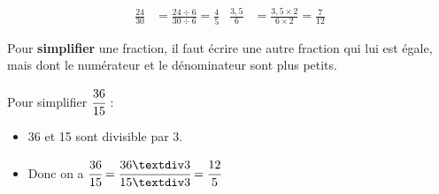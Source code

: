 \documentclass[a4paper,11pt]{article}
\begin{document}
\begin{exemple}
	\begin{align*}
		\frac{24}{30} & = \frac{24 ÷ 6}{30 ÷ 6} = \frac{4}{5}   &
		\frac{3,5}{6} & = \frac{3,5 × 2}{6 × 2} = \frac{7}{12}
	\end{align*}
\end{exemple}

\begin{cours}
	Pour \textbf{simplifier} une fraction, il faut écrire une autre fraction qui lui est égale, mais dont le numérateur et le dénominateur sont plus petits.
\end{cours}

\begin{exemple}
	Pour simplifier $\cfrac{36}{15}$ :
	\begin{itemize}
		\item 36 et 15 sont divisible par 3.
		\item Donc on a $\cfrac{36}{15} = \cfrac{36 ÷ 3}{15 ÷ 3} = \cfrac{12}{5}$
	\end{itemize}
\end{exemple}

\end{document}
